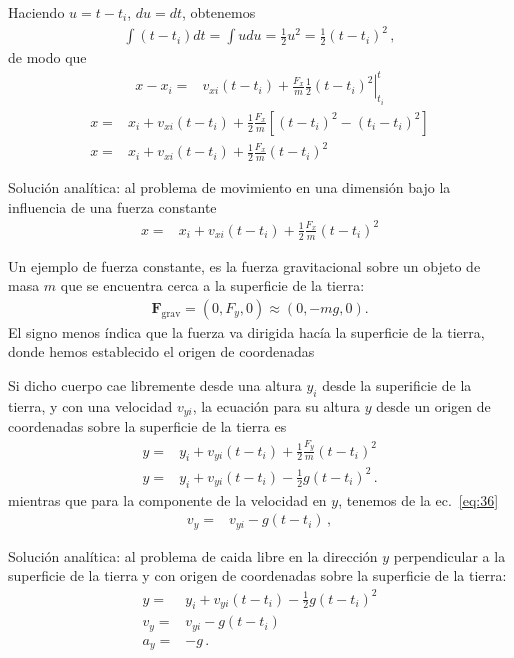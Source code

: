Haciendo $u=t-t_i$, $du=dt$, obtenemos
\begin{align}
\int(t-t_i)dt=\int u du=\frac{1}{2}u^2=\frac{1}{2}(t-t_i)^2\,,
\end{align}
de modo que
\begin{align}
  x-x_i=&v_{xi}(t-t_i)+\frac{F_x}{m}\left.\frac{1}{2}(t-t_i)^2\right|^t_{t_i}
\end{align}
\begin{align}
  x=&x_i+v_{xi}(t-t_i)+\frac{1}{2}\frac{F_x}{m}
  \left[
    (t-t_i)^2-(t_i-t_i)^2
  \right]\nonumber\\
  x=&x_i+v_{xi}(t-t_i)+\frac{1}{2}\frac{F_x}{m}(t-t_i)^2
\end{align}
\begin{frame}
  \begin{block}%
{Solución analítica:} al problema de movimiento en una dimensión bajo la influencia de una fuerza constante
\begin{align}
   x=&x_i+v_{xi}(t-t_i)+\frac{1}{2}\frac{F_x}{m}(t-t_i)^2
\end{align}
  \end{block}
\end{frame}


Un ejemplo de fuerza constante, es la fuerza gravitacional sobre un objeto de masa $m$ que se encuentra cerca a la superficie de la tierra:
\begin{align}
  \label{eq:29}
  \mathbf{F}_{\text{grav}}=(0,F_y,0)\approx(0,-mg,0).
\end{align}
El signo menos índica que la fuerza va dirigida hacía la superficie de la tierra, donde hemos establecido el origen de coordenadas

Si dicho cuerpo cae libremente desde una altura $y_i$ desde la superificie de la tierra, y con una velocidad $v_{yi}$, la ecuación para su altura $y$ desde un origen de coordenadas sobre la superficie de la tierra es
\begin{align}
\label{eq:31}
   y=&y_i+v_{yi}(t-t_i)+\frac{1}{2}\frac{F_y}{m}(t-t_i)^2\nonumber\\
   y=&y_i+v_{yi}(t-t_i)-\frac{1}{2}g(t-t_i)^2\,.
\end{align}
mientras que para la componente de la velocidad en $y$, tenemos de la ec.~\eqref{eq:36}
\begin{align}
  \label{eq:37}
    v_y =&v_{yi}-g(t-t_i)\,,
\end{align}

\begin{frame}
  \begin{block}%
{Solución analítica:} al problema de caida libre en la dirección $y$ perpendicular a la superficie de la tierra y con origen de coordenadas sobre la superficie de la tierra:
\begin{align*}
     y=&y_i+v_{yi}(t-t_i)-\frac{1}{2}g(t-t_i)^2\nonumber\\
     v_y =&v_{yi}-g(t-t_i)\nonumber\\
     a_y=&-g\,.
\end{align*}

  \end{block}
\end{frame}


